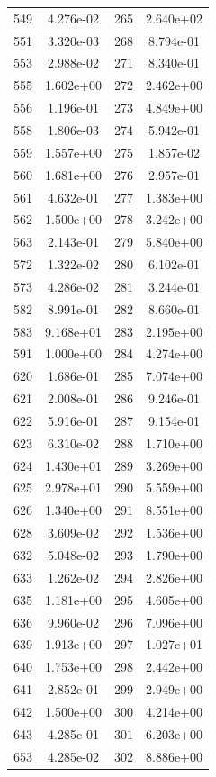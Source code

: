 \documentclass[12pt]{article}
\begin{document}
\begin{longtable}{@{}cccc@{}}
549 & 4.276e-02 & 265 & 2.640e+02 \\
551 & 3.320e-03 & 268 & 8.794e-01 \\
553 & 2.988e-02 & 271 & 8.340e-01 \\
555 & 1.602e+00 & 272 & 2.462e+00 \\
556 & 1.196e-01 & 273 & 4.849e+00 \\
558 & 1.806e-03 & 274 & 5.942e-01 \\
559 & 1.557e+00 & 275 & 1.857e-02 \\
560 & 1.681e+00 & 276 & 2.957e-01 \\
561 & 4.632e-01 & 277 & 1.383e+00 \\
562 & 1.500e+00 & 278 & 3.242e+00 \\
563 & 2.143e-01 & 279 & 5.840e+00 \\
572 & 1.322e-02 & 280 & 6.102e-01 \\
573 & 4.286e-02 & 281 & 3.244e-01 \\
582 & 8.991e-01 & 282 & 8.660e-01 \\
583 & 9.168e+01 & 283 & 2.195e+00 \\
591 & 1.000e+00 & 284 & 4.274e+00 \\
620 & 1.686e-01 & 285 & 7.074e+00 \\
621 & 2.008e-01 & 286 & 9.246e-01 \\
622 & 5.916e-01 & 287 & 9.154e-01 \\
623 & 6.310e-02 & 288 & 1.710e+00 \\
624 & 1.430e+01 & 289 & 3.269e+00 \\
625 & 2.978e+01 & 290 & 5.559e+00 \\
626 & 1.340e+00 & 291 & 8.551e+00 \\
628 & 3.609e-02 & 292 & 1.536e+00 \\
632 & 5.048e-02 & 293 & 1.790e+00 \\
633 & 1.262e-02 & 294 & 2.826e+00 \\
635 & 1.181e+00 & 295 & 4.605e+00 \\
636 & 9.960e-02 & 296 & 7.096e+00 \\
639 & 1.913e+00 & 297 & 1.027e+01 \\
640 & 1.753e+00 & 298 & 2.442e+00 \\
641 & 2.852e-01 & 299 & 2.949e+00 \\
642 & 1.500e+00 & 300 & 4.214e+00 \\
643 & 4.285e-01 & 301 & 6.203e+00 \\
653 & 4.285e-02 & 302 & 8.886e+00 \\

\end{longtable}
\end{document}
